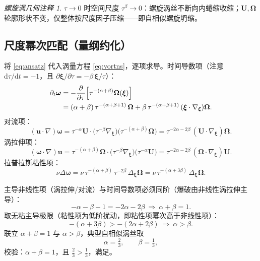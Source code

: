 \documentclass[11pt,a4paper]{article}
\newcommand{\dd}{\mathrm{d}}
\newcommand{\bxi}{\bm{\xi}}
\newcommand{\bu}{\bm{u}}
\newcommand{\bU}{\bm{U}}
\newcommand{\bom}{\bm{\omega}}
\newcommand{\bOm}{\bm{\Omega}}
\theoremstyle{remark}
\newtheorem{remark}[theorem]{螺旋涡几何注释}
\begin{document}
\begin{remark}
$\tau\to0$ 时空间尺度 $\tau^{\beta}\to0$：螺旋涡丝不断向内蜷缩收缩；$\bU,\bOm$ 轮廓形状不变，仅整体按尺度因子压缩——即自相似螺旋坍缩。
\end{remark}

\subsection{尺度幂次匹配（量纲约化）}

将 \eqref{eq:ansatz} 代入涡量方程 \eqref{eq:vortns}，逐项求导。时间导数项（注意 $\dd\tau/\dd t=-1$，且 $\partial\bxi/\partial\tau=-\beta\,\bxi/\tau$）：
\begin{align}
\label{eq:dtime}
\partial_t\bom
&=-\frac{\partial}{\partial\tau}\Bigl[\tau^{-(\alpha+\beta)}\bOm(\bxi)\Bigr] \notag\\
&=(\alpha+\beta)\,\tau^{-(\alpha+\beta+1)}\,\bOm+\beta\,\tau^{-(\alpha+\beta+1)}\,(\bxi\cdot\nabla_{\bxi})\bOm.
\end{align}
对流项：
\begin{equation}
(\bu\cdot\nabla)\bom=\tau^{-\alpha}\bU\cdot\bigl(\tau^{-\beta}\nabla_{\bxi}\bigr)\bigl(\tau^{-(\alpha+\beta)}\bOm\bigr)
=\tau^{-2\alpha-2\beta}\,(\bU\cdot\nabla_{\bxi})\bOm.
\end{equation}
涡拉伸项：
\begin{equation}
(\bom\cdot\nabla)\bu=\tau^{-(\alpha+\beta)}\bOm\cdot\bigl(\tau^{-\beta}\nabla_{\bxi}\bigr)\bigl(\tau^{-\alpha}\bU\bigr)
=\tau^{-2\alpha-2\beta}\,(\bOm\cdot\nabla_{\bxi})\bU.
\end{equation}
拉普拉斯粘性项：
\begin{equation}
\nu\Delta\bom=\nu\,\tau^{-(\alpha+\beta)}\,\tau^{-2\beta}\,\Delta_{\bxi}\bOm
=\nu\,\tau^{-(\alpha+3\beta)}\,\Delta_{\bxi}\bOm.
\end{equation}

主导非线性项（涡拉伸/对流）与时间导数项必须同阶（爆破由非线性涡拉伸主导）：
\begin{equation}
\label{eq:match}
-\alpha-\beta-1=-2\alpha-2\beta\ \Longrightarrow\ \alpha+\beta=1.
\end{equation}
取无粘主导极限（粘性项为低阶扰动，即粘性项幂次高于非线性项）：
\begin{equation}
\label{eq:viscsub}
-(\alpha+3\beta)>-(2\alpha+2\beta)\ \Longrightarrow\ \alpha>\beta.
\end{equation}
联立 $\alpha+\beta=1$ 与 $\alpha>\beta$，典型自相似涡丝取
\begin{equation}
\label{eq:exponents}
\alpha=\tfrac23,\qquad \beta=\tfrac13,
\end{equation}
校验：$\alpha+\beta=1$，且 $\frac23>\frac13$，满足。
\end{document}
